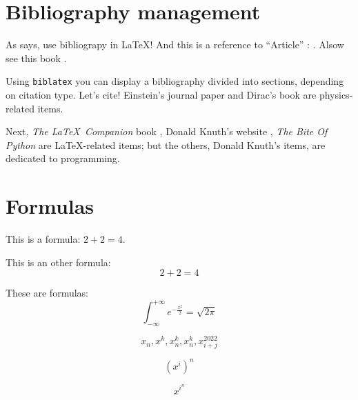 \section{Bibliography management}
As \parencite{example_book} says, use bibliograpy in \LaTeX{}! And this is a
reference to ``Article'' : \parencite{example_article}. Alsow see this book
\parencite{example_incollection}.

Using \texttt{biblatex} you can display a bibliography divided into sections,
depending on citation type.  Let's cite! Einstein's journal paper
\parencite{example_article} and Dirac's book \parencite{example_book} are
physics-related items.

Next, \textit{The \LaTeX\ Companion} book
\parencite{example_book}, Donald Knuth's website \parencite{example_online}, \textit{The
Bite Of Python} \parencite{byteofpython} are \LaTeX-related
items; but the others, Donald Knuth's items, \cite{example_inbook} are
dedicated to programming.

\section{Formulas}
This is a formula: $2 + 2 = 4$.

This is an other formula:
\[2 + 2 = 4\]

These are formulas:
\[\int_{-\infty}^{+\infty} e^{-\frac{x^2}{2}} = \sqrt{2 \pi}\]

\[x_n, x^k, x_n^k, x^k_n, x_{i + j}^{2022}\]

\[(x^i)^n\]

\[x^{i^n}\]

\listoffigures
\printbibliography


